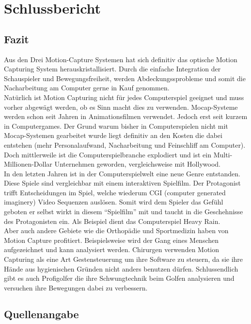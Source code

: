 \chapter{Schlussbericht}

\section{Fazit}
Aus den Drei Motion-Capture Systemen hat sich definitiv das optische Motion Capturing System herauskristallisiert. Durch die einfache Integration der Schauspieler und Bewegungsfreiheit, werden Abdeckungssprobleme und somit die Nacharbeitung am Computer gerne in Kauf genommen. \\
Natürlich ist Motion Capturing nicht für jedes Computerspiel geeignet und muss vorher abgewägt werden, ob es Sinn macht dies zu verwenden. Mocap-Systeme werden schon seit Jahren in Animationsfilmen verwendet. Jedoch erst seit kurzem in Computergames. Der Grund warum bisher in Computerspielen nicht mit Mocap-Systemen gearbeitet wurde liegt definitiv an den Kosten die dabei entstehen (mehr Personalaufwand, Nacharbeitung und Feinschliff am Computer). Doch mittlerweile ist die Computerspielbranche explodiert und ist ein Multi-Millionen-Dollar Unternehmen geworden, vergleichsweise mit Hollywood. \\
In den letzten Jahren ist in der Computerspielwelt eine neue Genre entstanden. Diese Spiele sind vergleichbar mit einem interaktiven Spielfilm. Der Protagonist trifft Entscheidungen im Spiel, welche wiederum CGI (computer generated imaginery) Video Sequenzen auslösen. Somit wird dem Spieler das Gefühl geboten er selbst wirkt in diesem ``Spielfilm'' mit und taucht in die Geschehnisse des Protagonisten ein. Als Beispiel dient das Computerspiel Heavy Rain.\\
Aber auch andere Gebiete wie die Orthopädie und Sportmedizin haben von Motion Capture profitiert. Beispielsweise wird der Gang eines Menschen aufgezeichnet und kann analysiert werden. Chirurgen verwenden Motion Capturing als eine Art Gestensteuerung um ihre Software zu steuern, da sie ihre Hände aus hygienischen Gründen nicht anders benutzen dürfen. Schlussendlich gibt es auch Profigolfer die ihre Schwungtechnik beim Golfen analysieren und versuchen ihre Bewegungen dabei zu verbessern.\\


\section{Quellenangabe}

